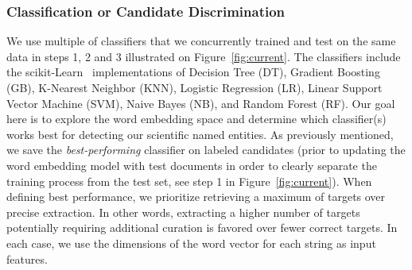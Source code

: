 \subsubsection{Classification or Candidate Discrimination}
We use multiple of classifiers that we concurrently trained and test on the same data in steps 1, 2 and 3 illustrated on Figure~\ref{fig:current}.
The classifiers include the scikit-Learn~\cite{scikit-learn} implementations of Decision Tree (DT), Gradient Boosting (GB), K-Nearest Neighbor (KNN), Logistic Regression (LR), Linear Support Vector Machine (SVM), Naive Bayes (NB), and Random Forest (RF). 
Our goal here is to explore the word embedding space and determine which classifier(s) works best for detecting our scientific named entities.
As previously mentioned, we save the \textit{best-performing} classifier on labeled candidates (prior to updating the word embedding model  with test documents in order to clearly separate the training process from the test set, see step 1 in Figure~\ref{fig:current}).
When defining best performance, we prioritize retrieving a maximum of targets over precise extraction.
In other words, extracting a higher number of targets potentially requiring additional curation is favored over fewer correct targets.
In each case, we use the dimensions of the word vector for each string as input features.




